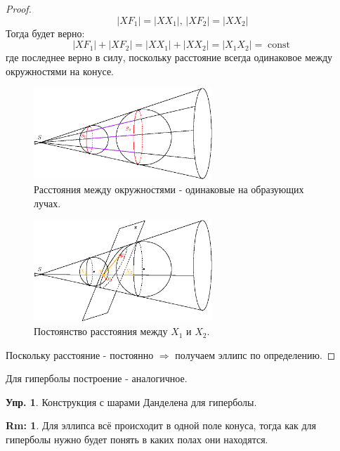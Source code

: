 \documentclass[12pt]{article}
\theoremstyle{definition}
\newtheorem{rem}{Rm:}
\newtheorem{exrc}{Упр.}
\DeclareMathOperator{\const}{\text{const}}
\begin{document}
\begin{proof}
	$$
		|XF_1| = |XX_1|, \, |XF_2| = |XX_2|
	$$ 
	Тогда будет верно:
	$$
		|XF_1| + |XF_2| = |XX_1| + |XX_2| = |X_1 X_2| = \const
	$$
	где последнее верно в силу, поскольку расстояние всегда одинаковое между окружностями на конусе.
	\begin{figure}[H]
		\centering
		\includegraphics[width=0.6\textwidth]{ANGL1_11.eps}
		\caption{Расстояния между окружностями - одинаковые на образующих лучах.}
		\label{1_11}
	\end{figure}
	\begin{figure}[H]
		\centering
		\includegraphics[width=0.6\textwidth]{ANGL1_12.eps}
		\caption{Постоянство расстояния между $X_1$ и $X_2$.}
		\label{1_12}
	\end{figure}
	Поскольку расстояние - постоянно $\Rightarrow$ получаем эллипс по определению.
\end{proof}

Для гиперболы построение - аналогичное.
\begin{exrc}
	Конструкция с шарами Данделена для гиперболы.
\end{exrc}
\begin{rem}
	Для эллипса всё происходит в одной поле конуса, тогда как для гиперболы нужно будет понять в каких полах они находятся.
\end{rem}
\end{document}

